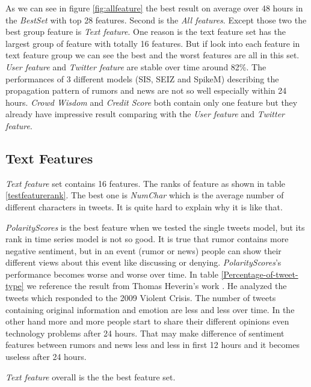  As we can see in figure \ref{fig:allfeature} the best result on average over 48 hours in the \emph{BestSet} with top 28 features. Second is the  \emph{All features}. Except those two the best group feature is \emph{Text feature}. One reason is the text feature set has the largest group of feature with totally 16 features. But if look into each feature in text feature group we can see the best and the worst features are all in this set. \emph{User feature} and \emph{Twitter feature} are stable over time around 82\%. The performances of 3 different models (SIS, SEIZ and SpikeM) describing the propagation pattern of rumors and news are not so well especially within 24 hours. \emph{Crowd Wisdom} and \emph{Credit Score} both contain only one feature but they already have impressive result comparing with the \emph{User feature} and \emph{Twitter feature}.
 \newpage
 
 \subsection{Text Features} 
 \emph{Text feature} set contains 16 features. The ranks of feature as shown in table \ref{testfeaturerank}. The best one is \emph{NumChar} which is the average number of different characters in tweets. It is quite hard to explain why it is like that. 
 
 \emph{PolarityScores} is the best feature when we tested the single tweets model, but its rank in time series model is not so good.  It is true that rumor contains more negative sentiment, but in an event (rumor or news) people can show their different views about this event \cite{mendoza2010twitter} \cite{starbird2014rumors} like discussing or denying.  \emph{ PolarityScores}'s performance becomes worse and worse over time. In table \ref{Percentage-of-tweet-type} we reference the result from Thomas Heverin's work \cite{heverin2010microblogging}. He analyzed the tweets which responded to the 2009 Violent Crisis. The number of tweets containing original information and emotion are less and less over time. In the other hand more and more people start to share their different opinions even technology problems after 24 hours. That may make difference of sentiment features between rumors and news less and less in first 12 hours and it becomes useless after 24 hours. 
 
  \emph{Text feature} overall is the the best feature set.
 

